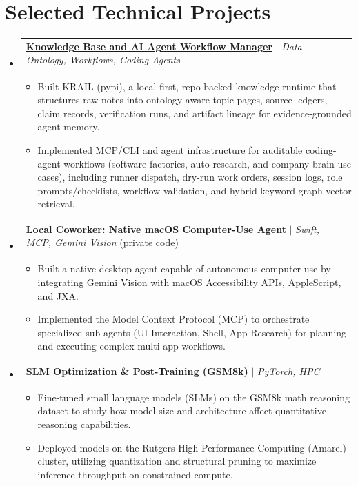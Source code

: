 \documentclass[letterpaper,11pt]{article}
\makeatletter
\newcommand{\resumeItem}[1]{
  \item\small{
    {#1 \vspace{-2pt}}
  }
}
\newcommand{\resumeProjectHeading}[2]{
    \item
    \begin{tabular*}{0.97\textwidth}{l@{\extracolsep{\fill}}r}
      \small#1 & #2 \\
    \end{tabular*}\vspace{-7pt}
}
\newcommand{\resumeSubHeadingListStart}{\begin{itemize}[leftmargin=0.15in, label={}]}
\newcommand{\resumeSubHeadingListEnd}{\end{itemize}}
\newcommand{\resumeItemListStart}{\begin{itemize}}
\newcommand{\resumeItemListEnd}{\end{itemize}\vspace{-5pt}}
\makeatother
\begin{document}
\section{Selected Technical Projects}
    \resumeSubHeadingListStart
      \resumeProjectHeading
          {\href{https://github.com/AkeBoss-tech/knowledge}{\textbf{Knowledge Base and AI Agent Workflow Manager}} $|$ \emph{Data Ontology, Workflows, Coding Agents} }{}
          \resumeItemListStart
            \resumeItem{Built KRAIL (pypi), a local-first, repo-backed knowledge runtime that structures raw notes into ontology-aware topic pages, source ledgers, claim records, verification runs, and artifact lineage for evidence-grounded agent memory.}
            \resumeItem{Implemented MCP/CLI and agent infrastructure for auditable coding-agent workflows (software factories, auto-research, and company-brain use cases), including runner dispatch, dry-run work orders, session logs, role prompts/checklists, workflow validation, and hybrid keyword-graph-vector retrieval.}
          \resumeItemListEnd

      \resumeProjectHeading
          {\textbf{Local Coworker: Native macOS Computer-Use Agent} $|$ \emph{Swift, MCP, Gemini Vision} (private code)}{}
          \resumeItemListStart
            \resumeItem{Built a native desktop agent capable of autonomous computer use by integrating Gemini Vision with macOS Accessibility APIs, AppleScript, and JXA.}
            \resumeItem{Implemented the Model Context Protocol (MCP) to orchestrate specialized sub-agents (UI Interaction, Shell, App Research) for planning and executing complex multi-app workflows.}
          \resumeItemListEnd

      \resumeProjectHeading
          {\href{https://github.com/AkeBoss-tech/llm-research}{\textbf{SLM Optimization \& Post-Training (GSM8k)}} $|$ \emph{PyTorch, HPC}}{}
          \resumeItemListStart
            \resumeItem{Fine-tuned small language models (SLMs) on the GSM8k math reasoning dataset to study how model size and architecture affect quantitative reasoning capabilities.}
            \resumeItem{Deployed models on the Rutgers High Performance Computing (Amarel) cluster, utilizing quantization and structural pruning to maximize inference throughput on constrained compute.}
          \resumeItemListEnd

    \resumeSubHeadingListEnd
\end{document}

